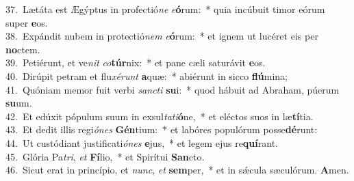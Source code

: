 {37.~}Lætáta est Ægýptus in profectió\textit{ne} \textit{e}\textbf{ó}rum:~* quia incúbuit timor eórum super \textbf{e}os.\\
{38.~}Expándit nubem in protectió\textit{nem} \textit{e}\textbf{ó}rum:~* et ignem ut lucéret eis per \textbf{no}ctem.\\
{39.~}Petiérunt, et ve\textit{nit} \textit{co}\textbf{túr}nix:~* et pane cæli saturávit \textbf{e}os.\\
{40.~}Dirúpit petram et flu\textit{xé}\textit{runt} \textbf{a}quæ:~* abiérunt in sicco \textbf{flú}mina;\\
{41.~}Quóniam memor fuit verbi \textit{san}\textit{cti} \textbf{su}i:~* quod hábuit ad Abraham, púerum \textbf{su}um.\\
{42.~}Et edúxit pópulum suum in exsul\textit{ta}\textit{ti}\textbf{ó}ne,~* et eléctos suos in læ\textbf{tí}tia.\\
{43.~}Et dedit illis regi\textit{ó}\textit{nes} \textbf{Gén}tium:~* et labóres populórum posse\textbf{dé}runt:\\
{44.~}Ut custódiant justificati\textit{ó}\textit{nes} \textbf{e}jus,~* et legem ejus re\textbf{quí}rant.\\
{45.~}Glória Pa\textit{tri}, \textit{et} \textbf{Fí}lio,~* et Spirítui \textbf{San}cto.\\
{46.~}Sicut erat in princípio, et \textit{nunc}, \textit{et} \textbf{sem}per,~* et in sǽcula sæculórum. \textbf{A}men.\\
